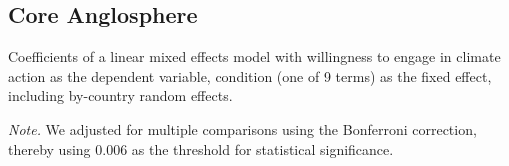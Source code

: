    \subsection{Core Anglosphere}

\begin{table}[H] 
\caption{Coefficients of a linear mixed effects model with willingness to engage in climate action as the dependent variable, condition (one of 9 terms) as the fixed effect, including by-country random effects.}
 
\end{table}
\textit{Note.} We adjusted for multiple comparisons using the Bonferroni correction, thereby using 0.006 as the threshold for statistical significance.

